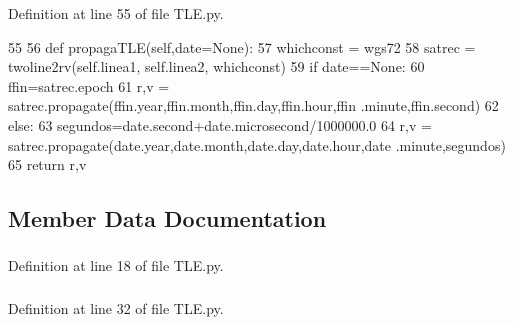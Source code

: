 \-Definition at line 55 of file \-T\-L\-E.\-py.


\begin{DoxyCode}
55 
56     def propagaTLE(self,date=None):
57         whichconst = wgs72
58         satrec = twoline2rv(self.linea1, self.linea2, whichconst)
59         if date==None:
60             ffin=satrec.epoch
61             r,v = satrec.propagate(ffin.year,ffin.month,ffin.day,ffin.hour,ffin
      .minute,ffin.second)
62         else:
63             segundos=date.second+date.microsecond/1000000.0
64             r,v = satrec.propagate(date.year,date.month,date.day,date.hour,date
      .minute,segundos)
65         return r,v
\end{DoxyCode}


\subsection{\-Member \-Data \-Documentation}
\subsubsection[{ap}]{}\label{class_tle_admin_1_1_t_l_e_1_1_tle_a1b415ca046b6ce1bf8fc2604eea15256}


\-Definition at line 18 of file \-T\-L\-E.\-py.

\subsubsection[{cat\-I\-D}]{}\label{class_tle_admin_1_1_t_l_e_1_1_tle_af51beef664c23e20552a16b34573ec5f}


\-Definition at line 32 of file \-T\-L\-E.\-py.

\subsubsection[{e}]{}\label{class_tle_admin_1_1_t_l_e_1_1_tle_a1c42d8620d9966d30a40d5fe87e09363}


